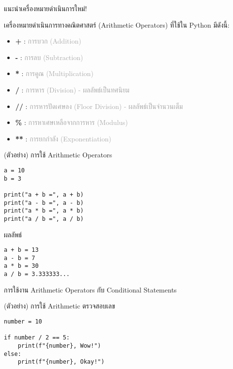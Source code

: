 \documentclass[12pt,a4paper]{article}
\newcommand{\textlight}[1]{{\thailightfont #1}}
\begin{document}
\begin{noticebox}{แนะนำเครื่องหมายดำเนินการใหม่!}

\textlight{เครื่องหมายดำเนินการทางคณิตศาสตร์ (Arithmetic Operators) ที่ใช้ใน Python มีดังนี้:}

\begin{itemize}
    \item \textbf{+} : \textcolor{darkgray}{การบวก (Addition)}
    \item \textbf{-} : \textcolor{darkgray}{การลบ (Subtraction)}
    \item \textbf{*} : \textcolor{darkgray}{การคูณ (Multiplication)}
    \item \textbf{/} : \textcolor{darkgray}{การหาร (Division) - ผลลัพธ์เป็นทศนิยม}
    \item \textbf{//} : \textcolor{darkgray}{การหารปัดเศษลง (Floor Division) - ผลลัพธ์เป็นจำนวนเต็ม}
    \item \textbf{\%} : \textcolor{darkgray}{การหาเศษเหลือจากการหาร (Modulus)}
    \item \textbf{**} : \textcolor{darkgray}{การยกกำลัง (Exponentiation)}
\end{itemize}

\begin{codebox}{(ตัวอย่าง) การใช้ Arithmetic Operators}
\begin{lstlisting}[style=python]
a = 10
b = 3

print("a + b =", a + b)
print("a - b =", a - b)
print("a * b =", a * b)   
print("a / b =", a / b)
\end{lstlisting}
\end{codebox}

\begin{resultbox}{ผลลัพธ์}
\begin{verbatim}
a + b = 13
a - b = 7
a * b = 30
a / b = 3.333333...
\end{verbatim}
\end{resultbox}

\textlight{การใช้งาน Arithmetic Operators กับ Conditional Statements}

\begin{codebox}{(ตัวอย่าง) การใช้ Arithmetic ตรวจสอบเลข}
\begin{lstlisting}[style=python]
number = 10

if number / 2 == 5:
    print(f"{number}, Wow!")
else:
    print(f"{number}, Okay!")
\end{lstlisting}
\end{codebox}

\end{noticebox}
\end{document}
